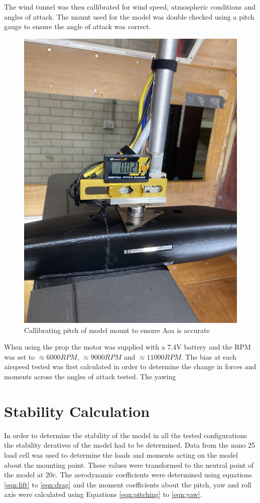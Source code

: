The wind tunnel was then callibrated for wind speed, atmospheric conditions and angles of attack. The mount used for the model was double checked using a pitch gauge to ensure the angle of attack was correct. 
\begin{figure}
    \centering
    \includegraphics[scale=0.1]{04_Methodology/Figs/pitchGauge.jpg}
    \caption{Callibrating pitch of model mount to ensure Aoa is accurate}
    \label{fig:pitchGauge}
\end{figure}

When using the prop the motor was supplied with a 7.4V battery and the RPM was set to $\approx 6000 RPM$, $\approx 9000RPM$ and $\approx 11000 RPM$. The bias at each airspeed tested was first calculated in order to determine the change in forces and moments across the angles of attack tested. The yawing 


\section{Stability Calculation}
In order to determine the stability of the model in all the tested configurations the stability deratives of the model had to be determined. Data from the nano 25 load cell was used to determine the loads and moments acting on the model about the mounting point. These values were transformed  to the neutral point of the model at 20$\overline{c}$. The aerodynamic coefficients were determined using equations \ref{eqn:lift} to \ref{eqn:drag} and the moment coefficients about the pitch, yaw and roll axis were calculated using Equations \ref{eqn:pitching} to \ref{eqn:yaw}. 





